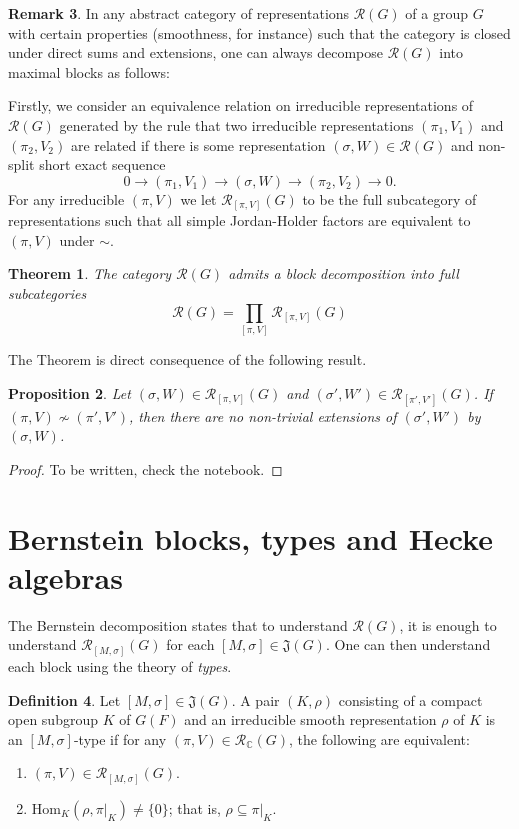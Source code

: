 \documentclass{article}
\newcommand{\Hom}{\mathrm{Hom}}
\newcommand{\cR}{\mathcal{R}}
\newcommand{\CC}{\mathbb{C}}
\theoremstyle{plain}
\newtheorem{theorem}{Theorem}[section]
\newtheorem{proposition}[theorem]{Proposition}
\theoremstyle{definition}
\newtheorem{definition}[theorem]{Definition}
\newtheorem{remark}[theorem]{Remark}
\begin{document}
    \begin{remark}
        In any abstract category of representations $\cR(G)$ of a group $G$ with certain properties (smoothness, for instance) such that the category is closed under direct sums and extensions, one can always decompose $\cR(G)$ into maximal blocks as follows:

        Firstly, we consider an equivalence relation on irreducible representations of $\cR(G)$ generated by the rule that two irreducible representations $(\pi_1,V_1)$ and $(\pi_2,V_2)$ are related if there is some representation $(\sigma,W)\in\cR(G)$ and non-split short exact sequence
        $$0\longrightarrow (\pi_1,V_1)\longrightarrow(\sigma,W)\longrightarrow(\pi_2,V_2)\longrightarrow 0.$$
        For any irreducible $(\pi,V)$ we let $\cR_{[\pi,V]}(G)$ to be the full subcategory of representations such that all simple Jordan-Holder factors are equivalent to $(\pi,V)$ under $\sim$.
        \begin{theorem}
            The category $\cR(G)$ admits a block decomposition into full subcategories 
            $$\cR(G)=\prod_{[\pi,V]}\cR_{[\pi,V]}(G)$$
        \end{theorem}
        The Theorem is direct consequence of the following result.
        \begin{proposition}
            Let $(\sigma,W)\in\cR_{[\pi,V]}(G)$ and $(\sigma',W')\in\cR_{[\pi',V']}(G)$. If $(\pi,V)\not\sim(\pi',V')$, then there are no non-trivial extensions of $(\sigma',W')$ by $(\sigma,W)$. 
        \end{proposition}
        \begin{proof}
            To be written, check the notebook.
        \end{proof}
    \end{remark}


    \section{Bernstein blocks, types and Hecke algebras}
    The Bernstein decomposition states that to understand $\cR(G)$, it is enough to understand $\cR_{[M,\sigma]}(G)$ for each $[M,\sigma]\in\mathfrak{J}(G)$. One can then understand each block using the theory of \textit{types}. 
    \begin{definition}
        Let $[M,\sigma]\in\mathfrak{J}(G)$. A pair $(K,\rho)$ consisting of a compact open subgroup $K$ of $G(F)$ and an irreducible smooth representation $\rho$ of $K$ is an $[M,\sigma]$-type if for any $(\pi,V)\in \cR_\CC(G)$, the following are equivalent:
        \begin{enumerate}
            \item $(\pi,V)\in\cR_{[M,\sigma]}(G).$
            \item $\Hom_K(\rho,\pi|_K)\neq\{0\}$; that is, $\rho\subseteq \pi|_K$.
        \end{enumerate}
    \end{definition}
\end{document}
